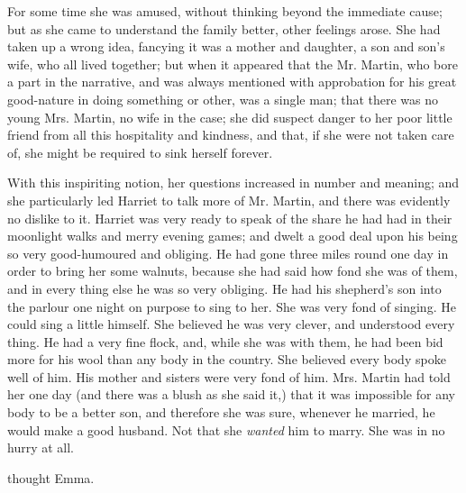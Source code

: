 For some time she was amused, without thinking beyond the immediate cause; but as she came to understand the family better, other feelings arose. She had taken up a wrong idea, fancying it was a mother and daughter, a son and son's wife, who all lived together; but when it appeared that the Mr. Martin, who bore a part in the narrative, and was always mentioned with approbation for his great good-nature in doing something or other, was a single man; that there was no young Mrs. Martin, no wife in the case; she did suspect danger to her poor little friend from all this hospitality and kindness, and that, if she were not taken care of, she might be required to sink herself forever.

With this inspiriting notion, her questions increased in number and meaning; and she particularly led Harriet to talk more of Mr. Martin, and there was evidently no dislike to it. Harriet was very ready to speak of the share he had had in their moonlight walks and merry evening games; and dwelt a good deal upon his being so very good-humoured and obliging. He had gone three miles round one day in order to bring her some walnuts, because she had said how fond she was of them, and in every thing else he was so very obliging. He had his shepherd's son into the parlour one night on purpose to sing to her. She was very fond of singing. He could sing a little himself. She believed he was very clever, and understood every thing. He had a very fine flock, and, while she was with them, he had been bid more for his wool than any body in the country. She believed every body spoke well of him. His mother and sisters were very fond of him. Mrs. Martin had told her one day (and there was a blush as she said it,) that it was impossible for any body to be a better son, and therefore she was sure, whenever he married, he would make a good husband. Not that she {\em wanted} him to marry. She was in no hurry at all.

 thought Emma. 



